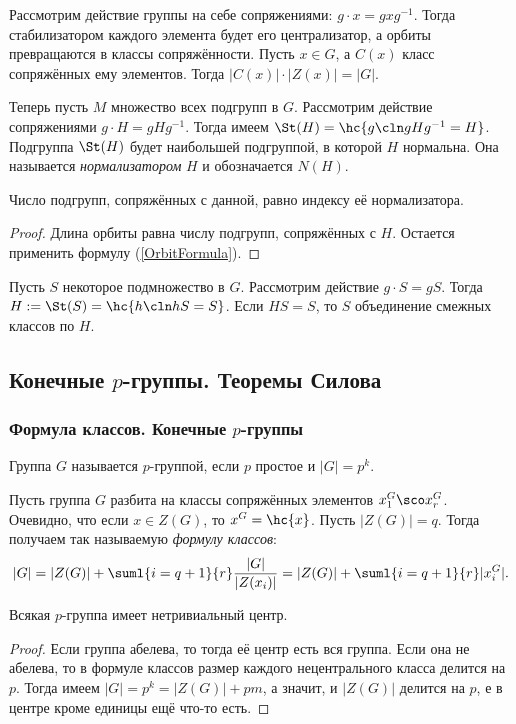 \documentclass[a4paper]{article}
\begin{document}
Рассмотрим действие группы на себе сопряжениями: $g\cdot x = gxg^{-1}$. Тогда стабилизатором каждого элемента
будет его централизатор, а орбиты превращаются в классы сопряжённости.
Пусть $x \in G$, а $C(x)$ класс сопряжённых ему элементов. Тогда $|C(x)|\cdot|Z(x)|=|G|$.

Теперь пусть $M$ множество всех подгрупп в $G$. Рассмотрим действие сопряжениями $g\cdot H = gHg^{-1}$. Тогда имеем
$\St(H) = \hc{g\cln gHg^{-1}=H}$. Подгруппа $\St(H)$ будет наибольшей подгруппой, в которой $H$ нормальна. Она называется
\emph{\emph{нормализатором}} $H$ и обозначается $N(H)$.

\begin{stm}
Число подгрупп, сопряжённых с данной, равно индексу её нормализатора.
\end{stm}
\begin{proof}
Длина орбиты равна числу подгрупп, сопряжённых с $H$. Остается применить формулу (\ref{OrbitFormula}).
\end{proof}

Пусть $S$ некоторое подмножество в $G$. Рассмотрим действие $g\cdot S = gS$. Тогда $H:=\St(S) = \hc{h\cln hS=S}$.
Если $HS=S$, то $S$ объединение смежных классов по $H$.

\subsection{Конечные $p$-группы. Теоремы Силова}

\subsubsection{Формула классов. Конечные $p$-группы}

\begin{df}
Группа $G$ называется $p$-группой, если $p$ простое и $|G| = p^k$.
\end{df}

Пусть группа $G$ разбита на классы сопряжённых элементов $x_1^G \sco x_r^G$. Очевидно,  что если $x \in
Z(G)$, то $x^G = \hc{x}$. Пусть $|Z(G)| = q$. Тогда получаем так называемую \emph{\emph{формулу
классов}}:
$$|G| = |Z(G)| + \suml{i=q+1}{r}\frac{|G|}{|Z(x_i)|} = |Z(G)| + \suml{i=q+1}{r}|x_i^G|.$$

\begin{theorem}
Всякая $p$-группа имеет нетривиальный центр.
\end{theorem}
\begin{proof}
Если группа абелева, то тогда её центр есть вся группа. Если она не абелева, то в формуле классов размер
каждого нецентрального класса делится на $p$. Тогда имеем $|G| = p^k = |Z(G)| + pm$, а значит, и $|Z(G)|$
делится на $p$, е в центре кроме единицы ещё что-то есть.
\end{proof}
\end{document}
